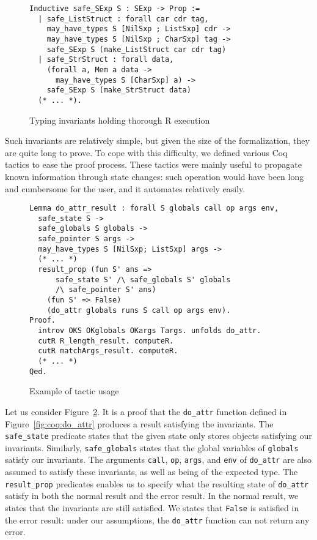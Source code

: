 \documentclass[
    sigplan,
    10pt,
    review, %
    natbib=false %
 ]{acmart}
\begin{document}
\begin{figure}
\begin{verbatim}
Inductive safe_SExp S : SExp -> Prop :=
  | safe_ListStruct : forall car cdr tag,
    may_have_types S [NilSxp ; ListSxp] cdr ->
    may_have_types S [NilSxp ; CharSxp] tag ->
    safe_SExp S (make_ListStruct car cdr tag)
  | safe_StrStruct : forall data,
    (forall a, Mem a data ->
      may_have_types S [CharSxp] a) ->
    safe_SExp S (make_StrStruct data)
  (* ... *).
\end{verbatim}
    \caption{Typing invariants holding thorough R execution}
    \label{fig:invariants:definition}
\end{figure}

Such invariants are relatively simple,
but given the size of the formalization,
they are quite long to prove.
To cope with this difficulty, we defined various Coq tactics
to ease the proof process.
These tactics were mainly useful to propagate known information
through state changes:
such operation would have been long and cumbersome for the user,
and it automates relatively easily.

\begin{figure}
\begin{verbatim}
Lemma do_attr_result : forall S globals call op args env,
  safe_state S ->
  safe_globals S globals ->
  safe_pointer S args ->
  may_have_types S [NilSxp; ListSxp] args ->
  (* ... *)
  result_prop (fun S' ans =>
      safe_state S' /\ safe_globals S' globals
      /\ safe_pointer S' ans)
    (fun S' => False)
    (do_attr globals runs S call op args env).
Proof.
  introv OKS OKglobals OKargs Targs. unfolds do_attr.
  cutR R_length_result. computeR.
  cutR matchArgs_result. computeR.
  (* ... *)
Qed.
\end{verbatim}
    \caption{Example of tactic usage}
    \label{fig:do_attr_result}
\end{figure}

Let us consider Figure~\ref{fig:do_attr_result}.
It is a proof that the \texttt{do_attr} function
defined in Figure~\ref{fig:coq:do_attr} produces a result
satisfying the invariants.
%
The \texttt{safe_state} predicate states
that the given state only stores objects satisfying our invariants.
Similarly, \texttt{safe_globals} states that the global variables
of \texttt{globals} satisfy our invariants.
The arguments \texttt{call}, \texttt{op},
\texttt{args}, and \texttt{env} of \texttt{do_attr}
are also assumed to satisfy these invariants,
as well as being of the expected type.
%
The \texttt{result_prop} predicates enables us
to specify what the resulting state of \texttt{do_attr}
satisfy in both the normal result and the error result.
In the normal result, we states that the invariants are still satisfied.
We states that \texttt{False} is satisfied in the error result:
under our assumptions, the \texttt{do_attr} function
can not return any error.
\end{document}
